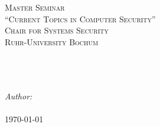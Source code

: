 
\begin{titlepage}

\centering

\vspace{2cm}

\textsc{\LARGE Master Seminar}\\[0.2cm]
\textsc{\LARGE ``Current Topics in Computer Security''}\\[0.9cm]
\textsc{\Large Chair for Systems Security}\\[0.5cm]
\textsc{\Large Ruhr-University Bochum}\\[1.5cm]

\HRule \\[0.4cm]
{ \huge \bfseries \@title}\\[0.4cm]

\HRule \\[1.5cm]

\begin{minipage}{0.4\textwidth}
\begin{flushleft} \large
\emph{Author:}\\{\@author}\\[1cm]
{\large \today}
\end{flushleft}
\end{minipage}

\end{titlepage}

